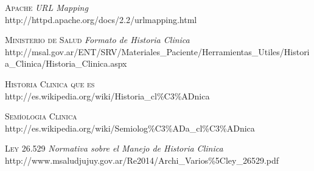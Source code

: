 \begin{thebibliography}{X}
     \textsc{Apache} \textit{URL Mapping}  \\
        http://httpd.apache.org/docs/2.2/urlmapping.html

     \textsc{Ministerio de Salud } \textit{Formato de Historia Clinica} \\
        http://msal.gov.ar/ENT/SRV/Materiales\_Paciente/Herramientas\_Utiles/Historia\_Clinica/Historia\_Clinica.aspx
   
     \textsc{Historia Clinica que es}  \\
        http://es.wikipedia.org/wiki/Historia\_cl\%C3\%ADnica

     \textsc{Sem\'{\i}ologia Clinica}  \\
        http://es.wikipedia.org/wiki/Semiolog\%C3\%ADa\_cl\%C3\%ADnica

     \textsc{Ley 26.529} \textit{Normativa sobre el Manejo de Historia Clinica} \\
        http://www.msaludjujuy.gov.ar/Re2014/Archi\_Varios\%5Cley\_26529.pdf
    
\end{thebibliography}
